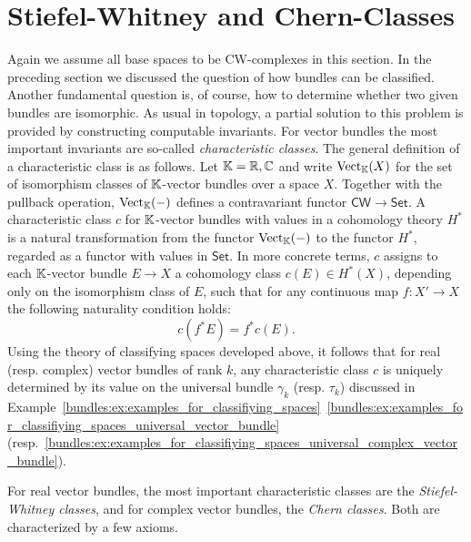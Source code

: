 \section{Stiefel-Whitney and Chern-Classes}

Again we assume all base spaces to be CW-complexes in this section. In the preceding section we discussed the question of how bundles can be classified. Another fundamental question is, of course, how to determine whether two given bundles are isomorphic. As usual in topology, a partial solution to this problem is provided by constructing computable invariants. For vector bundles the most important invariants are so-called \textit{characteristic classes}. The general definition of a characteristic class is as follows. Let $\mathbb{K} = \mathbb{R}, \mathbb{C}$ and write $\mathrm{Vect}_{\mathbb{K}}(X)$ for the set of isomorphism classes of $\mathbb{K}$-vector bundles over a space $X$. Together with the pullback operation, $\mathrm{Vect}_{\mathbb{K}}(-)$ defines a contravariant functor $\mathsf{CW} \to \mathsf{Set}$. A characteristic class $c$ for $\mathbb{K}$-vector bundles with values in a cohomology theory $H^\ast$ is a natural transformation from the functor $\mathrm{Vect}_{\mathbb{K}}(-)$ to the functor $H^\ast$, regarded as a functor with values in $\mathsf{Set}$. In more concrete terms, $c$ assigns to each $\mathbb{K}$-vector bundle $E \to X$ a cohomology class $c(E) \in H^\ast(X)$, depending only on the isomorphism class of $E$, such that for any continuous map $f \colon X' \to X$ the following naturality condition holds:
\[
c(f^\ast E) = f^\ast c(E).
\]
Using the theory of classifying spaces developed above, it follows that for real (resp. complex) vector bundles of rank $k$, any characteristic class $c$ is uniquely determined by its value on the universal bundle $\gamma_k$ (resp. $\tau_k$) discussed in Example~\ref{bundles:ex:examples_for_classifiying_spaces}~\ref{bundles:ex:examples_for_classifiying_spaces_universal_vector_bundle} (resp.~\ref{bundles:ex:examples_for_classifiying_spaces_universal_complex_vector_bundle}).

For real vector bundles, the most important characteristic classes are the \textit{Stiefel-Whitney classes}, and for complex vector bundles, the \textit{Chern classes}. Both are characterized by a few axioms.

